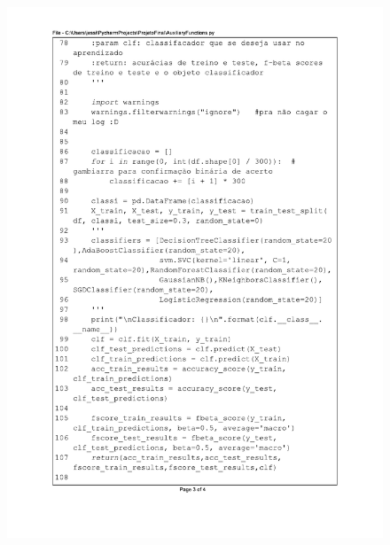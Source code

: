 \begin{figure}[H]
\centering
\includegraphics[scale=0.9]{01_Pre_textuais/code/analisa3.pdf}
\end{figure}
